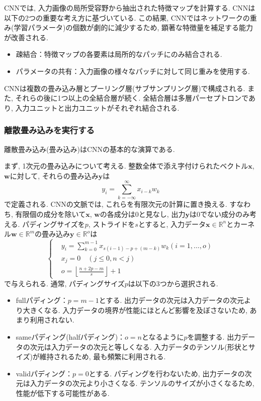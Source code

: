\documentclass[uplatex]{jsarticle}
\theoremstyle{definition}
\numberwithin{equation}{section}
\newcommand{\R}{\mathbb{R}}
\begin{document}
CNNでは, 入力画像の局所受容野から抽出された特徴マップを計算する.
CNNは以下の2つの重要な考え方に基づいている.
この結果, CNNではネットワークの重み(学習パラメータ)の個数が劇的に減少するため, 顕著な特徴量を補足する能力が改善される.
\begin{itemize}
    \item
    疎結合：特徴マップの各要素は局所的なパッチにのみ結合される.

    \item
    パラメータの共有：入力画像の様々なパッチに対して同じ重みを使用する.
\end{itemize}

CNNは複数の畳み込み層とプーリング層(サブサンプリング層)で構成される.
また, それらの後に1つ以上の全結合層が続く.
全結合層は多層パーセプトロンであり, 入力ユニットと出力ユニットがそれぞれ結合される.

\subsubsection{離散畳み込みを実行する}
離散畳み込み(畳み込み)はCNNの基本的な演算である.

まず, 1次元の畳み込みについて考える.
整数全体で添え字付けられたベクトル$\bm{x}$, $\bm{w}$に対して, それらの畳み込み$\bm{y}$は
\begin{equation}
    y_{i} = \sum_{k = -\infty}^{\infty} x_{i - k}w_{k}
\end{equation}
で定義される.
CNNの文脈では, これらを有限次元の計算に置き換える.
すなわち, 有限個の成分を除いて$\bm{x}$, $\bm{w}$の各成分は$0$と見なし, 出力$\bm{y}$は$0$でない成分のみ考える.
パディングサイズを$p$, ストライドを$s$とすると, 入力データ$\bm{x} \in \R^{n}$とカーネル$\bm{w} \in \R^{m}$の畳み込み$\bm{y} \in \R^{o}$は
\begin{equation}
    \left\{
    \begin{aligned}
        &y_{i} = \sum_{k = 0}^{m - 1} x_{s(i - 1) - p + (m - k)}w_{k} (i = 1, \dots, o) \\
        &x_{j} = 0 \quad (j \leq 0, n < j) \\
        &o = \left\lfloor\frac{n + 2p - m}{s}\right\rfloor + 1
    \end{aligned}
    \right.
\end{equation}
で与えられる.
通常, パディングサイズ$p$は以下の3つから選択される.
\begin{itemize}
    \item
    fullパディング：$p = m - 1$とする.
    出力データの次元は入力データの次元より大きくなる.
    入力データの境界が性能にほとんど影響を及ぼさないため, あまり利用されない.

    \item
    sameパディング(halfパディング)：$o = n$となるように$p$を調整する.
    出力データの次元は入力データの次元と等しくなる.
    入力データのテンソル(形状とサイズ)が維持されるため, 最も頻繁に利用される.

    \item
    validパディング：$p = 0$とする.
    パディングを行わないため, 出力データの次元は入力データの次元より小さくなる.
    テンソルのサイズが小さくなるため, 性能が低下する可能性がある.
\end{itemize}
\end{document}
